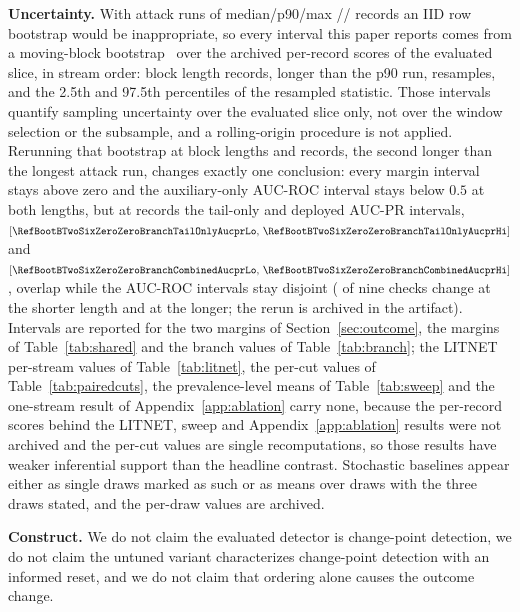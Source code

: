 \documentclass[manuscript,screen,nonacm]{acmart}
\begin{document}
\textbf{Uncertainty.} With attack runs of median/p90/max
\StreamCicidsTwoZeroOneSevenRunMedian/\StreamCicidsTwoZeroOneSevenRunPninety/\StreamCicidsTwoZeroOneSevenRunMax{}
records an IID row bootstrap would be inappropriate, so every interval this
paper reports comes from a moving-block bootstrap~\citep{kunsch1989jackknife}
over the archived per-record scores of the evaluated slice, in stream order:
block length
\RefBootBlockLength{} records, longer than the p90 run, \RefBootResamples{}
resamples, and the 2.5th and 97.5th percentiles of the resampled statistic.
Those intervals quantify sampling uncertainty over the evaluated slice only,
not over the window selection or the subsample, and a rolling-origin procedure
is not applied. Rerunning that bootstrap at block lengths
\RefBootRobustBlockLengthA{} and \RefBootRobustBlockLengthB{} records, the
second longer than the longest attack run, changes exactly one conclusion:
every margin interval stays above zero and the auxiliary-only AUC-ROC interval
stays below $0.5$ at both lengths, but at \RefBootRobustBlockLengthB{} records
the tail-only and deployed AUC-PR intervals,
$[\RefBootBTwoSixZeroZeroBranchTailOnlyAucprLo,\,\RefBootBTwoSixZeroZeroBranchTailOnlyAucprHi]$
and
$[\RefBootBTwoSixZeroZeroBranchCombinedAucprLo,\,\RefBootBTwoSixZeroZeroBranchCombinedAucprHi]$,
overlap while the AUC-ROC intervals stay disjoint
(\RefBootBTwoFiveZeroConclusionChanges{} of nine checks change at the shorter
length and \RefBootBTwoSixZeroZeroConclusionChanges{} at the longer; the rerun
is archived in the artifact). Intervals are reported for the two margins of
Section~\ref{sec:outcome}, the margins of Table~\ref{tab:shared} and the
branch values of Table~\ref{tab:branch}; the LITNET per-stream values of
Table~\ref{tab:litnet}, the per-cut values of Table~\ref{tab:pairedcuts}, the
prevalence-level means of Table~\ref{tab:sweep} and the one-stream result of
Appendix~\ref{app:ablation} carry none, because the per-record scores behind
the LITNET, sweep and Appendix~\ref{app:ablation} results were not archived and
the per-cut values are single recomputations, so those results have weaker
inferential support than the headline contrast.
Stochastic baselines appear either as single draws marked as such or as means
over draws with the three draws stated, and the per-draw values are archived.

\textbf{Construct.} We do not claim the evaluated detector is change-point
detection, we do not claim the untuned variant characterizes change-point
detection with an informed reset, and we do not claim that ordering alone causes the
outcome change.
\end{document}
